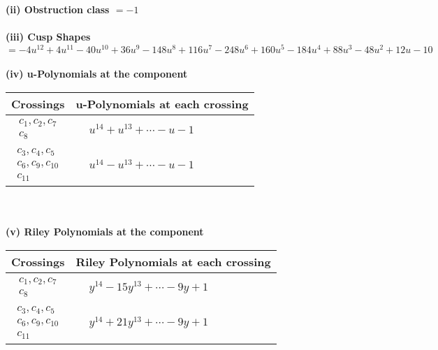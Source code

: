 \documentclass[1p]{elsarticle_modified}
\theoremstyle{definition}
\begin{document}
\flushleft \textbf{(ii) Obstruction class $= -1$}\\~\\
\flushleft \textbf{(iii) Cusp Shapes $= -4 u^{12}+4 u^{11}-40 u^{10}+36 u^9-148 u^8+116 u^7-248 u^6+160 u^5-184 u^4+88 u^3-48 u^2+12 u-10$}\\~\\
\newpage\renewcommand{\arraystretch}{1}
\flushleft \textbf{(iv) u-Polynomials at the component}\newline \\
\begin{tabular}{m{50pt}|m{274pt}}
Crossings & \hspace{64pt}u-Polynomials at each crossing \\
\hline $$\begin{aligned}c_{1},c_{2},c_{7}\\c_{8}\end{aligned}$$&$\begin{aligned}
&u^{14}+u^{13}+\cdots- u-1
\end{aligned}$\\
\hline $$\begin{aligned}c_{3},c_{4},c_{5}\\c_{6},c_{9},c_{10}\\c_{11}\end{aligned}$$&$\begin{aligned}
&u^{14}- u^{13}+\cdots- u-1
\end{aligned}$\\
\hline
\end{tabular}\\~\\
\newpage\renewcommand{\arraystretch}{1}
\flushleft \textbf{(v) Riley Polynomials at the component}\newline \\
\begin{tabular}{m{50pt}|m{274pt}}
Crossings & \hspace{64pt}Riley Polynomials at each crossing \\
\hline $$\begin{aligned}c_{1},c_{2},c_{7}\\c_{8}\end{aligned}$$&$\begin{aligned}
&y^{14}-15 y^{13}+\cdots-9 y+1
\end{aligned}$\\
\hline $$\begin{aligned}c_{3},c_{4},c_{5}\\c_{6},c_{9},c_{10}\\c_{11}\end{aligned}$$&$\begin{aligned}
&y^{14}+21 y^{13}+\cdots-9 y+1
\end{aligned}$\\
\hline
\end{tabular}\\~\\
\end{document}

